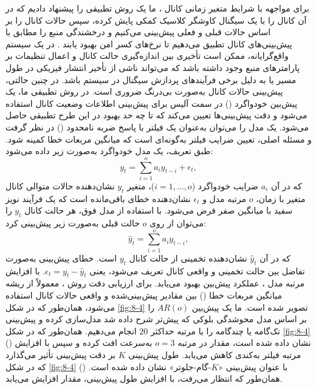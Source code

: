 برای مواجهه با شرایط متغیر زمانی کانال ، ما یک روش تطبیقی را پیشنهاد دادیم که در آن کانال  را با یک سیگنال کاوشگر کلاسیک کمکی پایش کرده، سپس حالات کانال را بر اساس حالات قبلی و فعلی پیش‌بینی می‌کنیم و درخشندگی منبع را مطابق با پیش‌بینی‌های کانال تطبیق می‌دهیم تا نرخ‌های کسر امن بهبود یابند \cite{8-21}. در یک سیستم  واقع‌گرایانه، ممکن است تأخیری بین اندازه‌گیری حالت کانال و اعمال تنظیمات بر پارامترهای منبع وجود داشته باشد که می‌تواند ناشی از تأخیر انتشار فیزیکی در طول مسیر یا به دلیل برخی فرآیندهای پردازش سیگنال در سیستم باشد. در چنین حالتی، پیش‌بینی حالات کانال به‌صورت بی‌درنگ ضروری است. در روش تطبیقی ما، یک پیش‌بین خودواگرد () در سمت آلیس برای پیش‌بینی اطلاعات وضعیت کانال استفاده می‌شود و دقت پیش‌بینی‌ها تعیین می‌کند که تا چه حد بهبود در این طرح تطبیقی حاصل می‌شود. یک مدل  را می‌توان به‌عنوان یک فیلتر با پاسخ ضربه نامحدود () در نظر گرفت و مسئله اصلی، تعیین ضرایب فیلتر به‌گونه‌ای است که میانگین مربعات خطا کمینه شود. طبق تعریف، یک مدل خودواگرد به‌صورت زیر داده می‌شود:
\begin{equation}
	y_t = \sum_{i=1}^{o} a_i y_{t-i} + \epsilon_t,
	\label{eq:8-50}
\end{equation}
که در آن $a_i$ ضرایب خودواگرد ($i = 1, \dots, o$)، متغیر $y_t$ نشان‌دهنده حالات متوالی کانال متغیر با زمان، $o$ مرتبه مدل و $\epsilon_t$ نشان‌دهنده خطای باقی‌مانده است که یک فرآیند نویز سفید با میانگین صفر فرض می‌شود. با استفاده از مدل  فوق، هر حالت کانال $y_t$ را می‌توان از روی $o$ حالت قبلی به‌صورت زیر پیش‌بینی کرد:
\begin{equation}
	\hat{y}_t = \sum_{i=1}^{o} a_i y_{t-i},
	\label{eq:8-51}
\end{equation}
که در آن $\hat{y}_t$ نشان‌دهنده تخمینی از حالت کانال $y_t$ است. خطای پیش‌بینی به‌صورت تفاضل بین حالت تخمینی و واقعی کانال تعریف می‌شود، یعنی $\epsilon_t = y_t - \hat{y}_t$. با افزایش مرتبه مدل ، عملکرد پیش‌بین بهبود می‌یابد. برای ارزیابی دقت روش ، معمولاً از ریشه میانگین مربعات خطا () بین مقادیر پیش‌بینی‌شده و واقعی حالات کانال استفاده می‌شود، همان‌طور که در شکل \ref{fig:8-4} تصویر شده است. ما یک پیش‌بین $AR(o)$ را بر اساس مدل محوشدگی بلوکی که پیش‌تر شرح داده شد مدل‌سازی کرده و پیش‌بینی تک‌گامه یا چندگامه را با مرتبه حداکثر $20$ انجام می‌دهیم. همان‌طور که در شکل \ref{fig:8-4} () نشان داده شده است، مقدار  در مرتبه $o = 3$ به‌سرعت افت کرده و سپس با افزایش مرتبه فیلتر به‌کندی کاهش می‌یابد. طول پیش‌بینی $K$ بر دقت پیش‌بینی تأثیر می‌گذارد که در شکل \ref{fig:8-4} () با عنوان پیش‌بینی «$K$-گام-جلوتر» نشان داده شده است. همان‌طور که انتظار می‌رفت، با افزایش طول پیش‌بینی، مقدار  افزایش می‌یابد.

